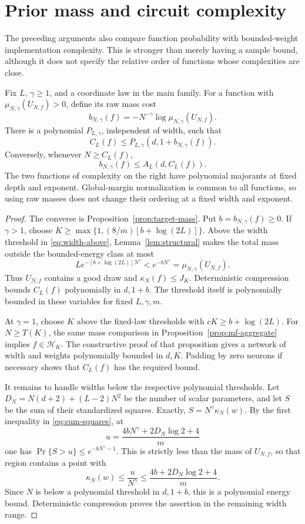 \section{Prior mass and circuit complexity}\label{sec:prior-complexity}
The preceding arguments also compare function probability with bounded-weight
implementation complexity. This is stronger than merely having a sample
bound, although it does not specify the relative order of functions whose
complexities are close.

\begin{corollary}
\label{cor:prior-complexity}
Fix $L$, $\gamma\geq1$, and a coordinate law in the main family. For a
function with $\mu_{N,\gamma}(U_{N,f})>0$, define its raw mass cost
\[
 b_{N,\gamma}(f)=-N^{-\gamma}\log\mu_{N,\gamma}(U_{N,f}).
\]
There is a polynomial $P_{L,\gamma}$, independent of width, such that
\[
 C_L(f)\leq P_{L,\gamma}(d,1+b_{N,\gamma}(f)).
\]
Conversely, whenever $N\geq C_L(f)$,
\[
 b_{N,\gamma}(f)\leq A_L(d,C_L(f)).
\]
The two functions of complexity on the right have polynomial majorants at
fixed depth and exponent. Global-margin normalization is common to all
functions, so using raw masses does not change their ordering at a fixed
width and exponent.
\end{corollary}
\begin{proof}
The converse is Proposition~\ref{prop:target-mass}. Put
$b=b_{N,\gamma}(f)\geq0$. If $\gamma>1$, choose
$K\geq\max\{1,(8/m)[b+\log(2L)]\}$. Above the width threshold
in \eqref{eq:width-above}, Lemma~\ref{lem:structural} makes the total
mass outside the bounded-energy class at most
\[
 Le^{-[b+\log(2L)]N^\gamma}<e^{-bN^\gamma}
       =\mu_{N,\gamma}(U_{N,f}).
\]
Thus $U_{N,f}$ contains a good draw and $\kappa_N(f)\leq J_K$.
Deterministic compression bounds $C_L(f)$ polynomially in $d,1+b$.
The threshold itself is polynomially bounded in these variables for fixed
$L,\gamma,m$.

At $\gamma=1$, choose $K$ above the fixed-law thresholds with
$cK\geq b+\log(2L)$. For $N\geq T(K)$, the same mass comparison in
Proposition~\ref{prop:mf-aggregate} implies $f\in\mathcal H_K$.
The constructive proof of that proposition gives a network of width and
weights polynomially bounded in $d,K$. Padding by zero neurons if
necessary shows that $C_L(f)$ has the required bound.

It remains to handle widths below the respective polynomial thresholds.
Let $D_N=N(d+2)+(L-2)N^2$ be the number of scalar parameters, and let
$S$ be the sum of their standardized squares. Exactly,
$S=N^\gamma\kappa_N(w)$. By the first inequality in
\eqref{eq:sum-squares}, at
\[
 u=\frac{4bN^\gamma+2D_N\log2+4}{m}
\]
one has $\Pr\{S>u\}\leq e^{-bN^\gamma-1}$.
This is strictly less than the mass of $U_{N,f}$, so that region contains
a point with
\[
 \kappa_N(w)\leq\frac u{N^\gamma}
 \leq\frac{4b+2D_N\log2+4}{m}.
\]
Since $N$ is below a polynomial threshold in $d,1+b$, this is a
polynomial energy bound. Deterministic compression proves the assertion
in the remaining width range.
\end{proof}

